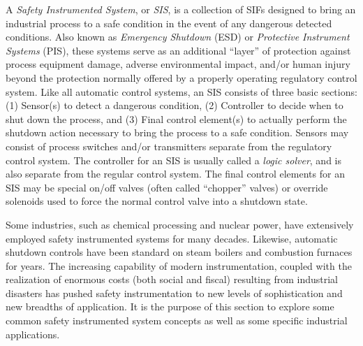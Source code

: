 A \textit{Safety Instrumented System}, or \textit{SIS}, is a collection of SIFs designed to bring an industrial process to a safe condition in the event of any dangerous detected conditions.  Also known as \textit{Emergency Shutdown} (ESD) or \textit{Protective Instrument Systems} (PIS), these systems serve as an additional ``layer'' of protection against process equipment damage, adverse environmental impact, and/or human injury beyond the protection normally offered by a properly operating regulatory control system.  Like all automatic control systems, an SIS consists of three basic sections: (1) Sensor(s) to detect a dangerous condition, (2) Controller to decide when to shut down the process, and (3) Final control element(s) to actually perform the shutdown action necessary to bring the process to a safe condition.  Sensors may consist of process switches and/or transmitters separate from the regulatory control system.  The controller for an SIS is usually called a \textit{logic solver}, and is also separate from the regular control system.  The final control elements for an SIS may be special on/off valves (often called ``chopper'' valves) or override solenoids used to force the normal control valve into a shutdown state.            

Some industries, such as chemical processing and nuclear power, have extensively employed safety instrumented systems for many decades.  Likewise, automatic shutdown controls have been standard on steam boilers and combustion furnaces for years.  The increasing capability of modern instrumentation, coupled with the realization of enormous costs (both social and fiscal) resulting from industrial disasters has pushed safety instrumentation to new levels of sophistication and new breadths of application.  It is the purpose of this section to explore some common safety instrumented system concepts as well as some specific industrial applications.

\vskip 10pt

